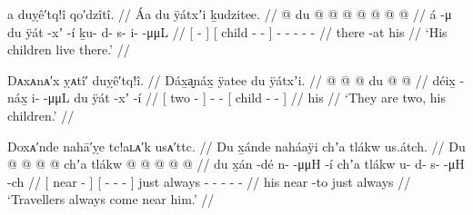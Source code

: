 
\ex\label{ex:92-2-children-live-there}%
%
\begingl
	\glpreamble	a duỵê′tq!î qo′dzîtî.  //
	\glpreamble	Áa du ÿátxʼi ḵudzitee. //
	\gla	{}  @ {} {} {} du  @ {} @ {} {}
		 @ {} @ {} @ {} @ {} @ {} //
	\glb	{} á -μ {} {} du ÿát -xʼ -í {}
		ḵu- d- s- i-  -μμL //
	\glc	{}[  - {}]
		{}[  child - - {}]
		- - - -  - //
	\gld	{} there -at {} {} his  {} {} {}
		 {} {} {} {} {} //
	\glft	‘His children live there.’
		//
\endgl
\xe

\ex\label{ex:92-3-his-children-are-two}%
%
\begingl
	\glpreamble	Dᴀxᴀnᴀ′x ỵᴀtî′ duỵê′tq!î. //
	\glpreamble	Dáx̱a̬náx̱ ÿatee du ÿátxʼi. //
	\gla	{}  @ {} {}  @ {} @ {}
		{} du  @ {} @ {} {} //
	\glb	{} déix̱ -náx̱ {} i-  -μμL
		{} du ÿát -xʼ -í {} //
	\glc	{}[ two - {}] -  -
		{}[  child - - {}] //
	\gld	{}  {} {}  {} {}
		{} his  {} {} {} //
	\glft	‘They are two, his children.’
		//
\endgl
\xe

\ex\label{ex:92-4-travellers-always-visit}%
%
\begingl
	\glpreamble	Doxᴀ′nde nahā′ỵe tc!aʟᴀ′k usᴀ′ttc. //
	\glpreamble	Du x̱ánde naháaÿi chʼa tlákw us.átch. //
	\gla	{} Du  @ {} {}
		{}  @ {} @ {} @ {} {}
		chʼa tlákw  @ {} @ {} @ {} @ {} @ {} //
	\glb	{} du x̱án -dé {}
		{} n-  -μμH -í {}
		chʼa tlákw u- d- s-  -μH -ch //
	\glc	{}[  near - {}]
		{}[ -  - - {}]
		just always - - -
			 - - //
	\gld	{} his near -to {}
		{}  {} {} {} {}
		just always  {} {} {} {} {} //
	\glft	‘Travellers always come near him.’
		//
\endgl
\xe


